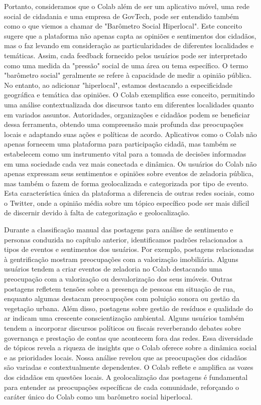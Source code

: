 Portanto, consideramos que o Colab além de ser um aplicativo móvel, uma rede social de cidadania e uma empresa de GovTech, pode ser entendido também como o que viemos a chamar de "Barômetro Social Hiperlocal". Este conceito sugere que a plataforma não apenas capta as opiniões e sentimentos dos cidadãos, mas o faz levando em consideração as particularidades de diferentes localidades e temáticas. Assim, cada feedback fornecido pelos usuários pode ser interpretado como uma medida da "pressão" social de uma área ou tema específico. O termo "barômetro social" geralmente se refere à capacidade de medir a opinião pública. No entanto, ao adicionar "hiperlocal", estamos destacando a especificidade geográfica e temática das opiniões. O Colab exemplifica esse conceito, permitindo uma análise contextualizada dos discursos tanto em diferentes localidades quanto em variados assuntos. Autoridades, organizações e cidadãos podem se beneficiar dessa ferramenta, obtendo uma compreensão mais profunda das preocupações locais e adaptando suas ações e políticas de acordo. Aplicativos como o Colab não apenas fornecem uma plataforma para participação cidadã, mas também se estabelecem como um instrumento vital para a tomada de decisões informadas em uma sociedade cada vez mais conectada e dinâmica. Os usuários do Colab não apenas expressam seus sentimentos e opiniões sobre eventos de zeladoria pública, mas também o fazem de forma geolocalizada e categorizada por tipo de evento. Esta característica única da plataforma a diferencia de outras redes sociais, como o Twitter, onde a opinião média sobre um tópico específico pode ser mais difícil de discernir devido à falta de categorização e geolocalização.

Durante a classificação manual das postagens para análise de sentimento e personas conduzida no capítulo anterior, identificamos padrões relacionados a tipos de eventos e sentimentos dos usuários. Por exemplo, postagens relacionadas à gentrificação mostram preocupações com a valorização imobiliária. Alguns usuários tendem a criar eventos de zeladoria no Colab destacando uma preocupação com a valorização ou desvalorização dos seus imóveis. Outras postagens refletem tensões sobre a presença de pessoas em situação de rua, enquanto algumas destacam preocupações com poluição sonora ou gestão da vegetação urbana. Além disso, postagens sobre gestão de resíduos e qualidade do ar indicam uma crescente conscientização ambiental. Alguns usuários também tendem a incorporar discursos políticos ou fiscais reverberando debates sobre governança e prestação de contas que acontecem fora das redes. Essa diversidade de tópicos revela a riqueza de insights que o Colab oferece sobre a dinâmica social e as prioridades locais. Nossa análise revelou que as preocupações dos cidadãos são variadas e contextualmente dependentes. O Colab reflete e amplifica as vozes dos cidadãos em questões locais. A geolocalização das postagens é fundamental para entender as preocupações específicas de cada comunidade, reforçando o caráter único do Colab como um barômetro social hiperlocal.

